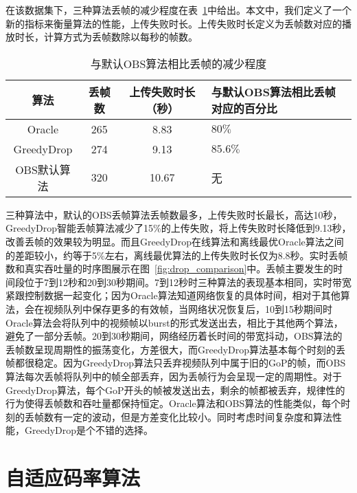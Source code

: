 在该数据集下，三种算法丢帧的减少程度在表~\ref{tab_drop}中给出。本文中，我们定义了一个新的指标来衡量算法的性能，上传失败时长。上传失败时长定义为丢帧数对应的播放时长，计算方式为丢帧数除以每秒的帧数。

\begin{table}[tb]
\centering
\caption{与默认OBS算法相比丢帧的减少程度}
\label{tab_drop}
    \begin{tabularx}{\linewidth}{cccX}
    \toprule[1.5pt]
    \textbf{算法} &\textbf{丢帧数} &\textbf{上传失败时长（秒）} & \textbf{与默认OBS算法相比丢帧对应的百分比}    \\ \midrule[1pt]
    Oracle    &265  &8.83  &$80\%$           \\
    GreedyDrop  &274 &9.13  &$85.6\%$              \\
    OBS默认算法     &320  &10.67  &无 \\
    \bottomrule[1.5pt]
\end{tabularx}
\end{table}

三种算法中，默认的OBS丢帧算法丢帧数最多，上传失败时长最长，高达10秒，GreedyDrop智能丢帧算法减少了15\%的上传失败，将上传失败时长降低到9.13秒，改善丢帧的效果较为明显。而且GreedyDrop在线算法和离线最优Oracle算法之间的差距较小，约等于5\%左右，离线最优算法的上传失败时长仅为8.8秒。实时丢帧数和真实吞吐量的时序图展示在图~\ref{fig:drop_comparison}中。丢帧主要发生的时间段位于7到12秒和20到30秒期间。7到12秒时三种算法的表现基本相同，实时带宽紧跟控制数据一起变化；因为Oracle算法知道网络恢复的具体时间，相对于其他算法，会在视频队列中保存更多的有效帧，当网络状况恢复后，10到15秒期间时Oracle算法会将队列中的视频帧以burst的形式发送出去，相比于其他两个算法，避免了一部分丢帧。20到30秒期间，网络经历着长时间的带宽抖动，OBS算法的丢帧数呈现周期性的振荡变化，方差很大，而GreedyDrop算法基本每个时刻的丢帧都很稳定。因为GreedyDrop算法只丢弃视频队列中属于旧的GoP的帧，而OBS算法每次丢帧将队列中的帧全部丢弃，因为丢帧行为会呈现一定的周期性。对于GreedyDrop算法，每个GoP开头的帧被发送出去，剩余的帧都被丢弃，规律性的行为使得丢帧数和吞吐量都保持恒定。Oracle算法和OBS算法的性能类似，每个时刻的丢帧数有一定的波动，但是方差变化比较小。同时考虑时间复杂度和算法性能，GreedyDrop是个不错的选择。

\section{自适应码率算法}
